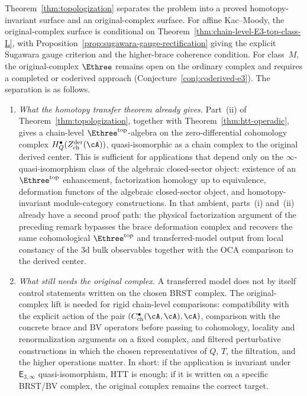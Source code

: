 \begin{remark}
\label{rem:research-chain-level-topologization}
%
%
Theorem~\ref{thm:topologization} separates the problem into a proved
homotopy-invariant surface and an original-complex surface. For affine
Kac--Moody, the original-complex surface is conditional on
Theorem~\ref{thm:chain-level-E3-top-class-L}, with
Proposition~\ref{prop:sugawara-gauge-rectification} giving the
explicit Sugawara gauge criterion and the higher-brace coherence
condition. For class~$M$, the
original-complex $\Ethree$ remains open on the ordinary complex
and requires a completed or coderived approach
(Conjecture~\ref{conj:coderived-e3}). The separation is as follows.
\begin{enumerate}[label=\textup{(\roman*)}]
\item \emph{What the homotopy transfer theorem already gives.}
 Part~\textup{(ii)} of Theorem~\ref{thm:topologization}, together
 with Theorem~\ref{thm:htt-operadic}, gives a chain-level
 $\Ethree^{\mathrm{top}}$-algebra on the zero-differential
 cohomology complex
 $H_Q^\bullet(Z^{\mathrm{der}}_{\mathrm{ch}}(\cA))$,
 quasi-isomorphic as a chain complex to the original derived center.
 This is sufficient for applications that depend only on the
 $\infty$-quasi-isomorphism class of the algebraic closed-sector
 object: existence of
 an $\Ethree^{\mathrm{top}}$ enhancement, factorization homology up
 to equivalence, deformation functors of the algebraic closed-sector
 object, and
 homotopy-invariant module-category constructions. In that ambient,
parts~\textup{(i)} and~\textup{(ii)} already have a second proof
 path: the physical factorization argument of the preceding remark
 bypasses the brace deformation complex and recovers the same
 cohomological $\Ethree^{\mathrm{top}}$ and transferred-model output
 from local constancy of the $3$d bulk observables together with the
 OCA comparison to the derived center.

\item \emph{What still needs the original complex.}
 A transferred model does not by itself control statements written
 on the chosen BRST complex. The original-complex lift is needed for
 rigid chain-level comparisons: compatibility with the explicit
 action of the pair
 $(C^\bullet_{\mathrm{ch}}(\cA,\cA),\cA)$, comparison with the
 concrete brace and BV operators before passing to cohomology,
 locality and renormalization arguments on a fixed complex, and
 filtered perturbative constructions in which the chosen
 representatives of $Q$, $T$, the filtration, and the higher
 operations matter. In short: if the application is invariant under
 $\mathsf{E}_{3,\infty}$ quasi-isomorphism, HTT is enough; if it is written
 on a specific BRST/BV complex, the original complex remains the
 correct target.


\end{enumerate}
\end{remark}
